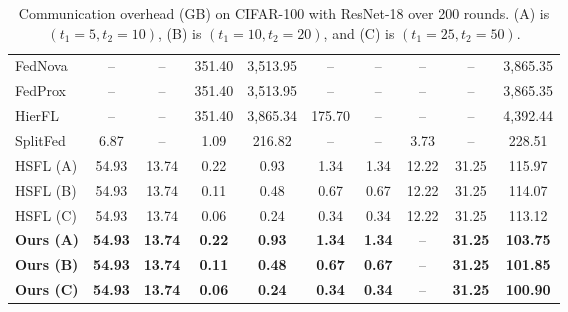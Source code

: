 \documentclass[letterpaper]{article} %
\begin{document}
\begin{table}[!ht]
\begin{tabular}{l|cccccccc|c}
            FedNova & -- & -- & 351.40 & 3,513.95 & -- & -- & -- & -- & 3,865.35 \\
            FedProx & -- & -- & 351.40 & 3,513.95 & -- & -- & -- & -- & 3,865.35 \\ \hline
            HierFL & -- & -- & 351.40 & 3,865.34 & 175.70 & -- & -- & -- & 4,392.44 \\ \hline
            SplitFed & 6.87 & -- & 1.09 & 216.82 & -- & -- & 3.73 & -- & 228.51 \\ \hline
            HSFL (A) & 54.93 & 13.74 & 0.22 & 0.93 & 1.34 & 1.34 & 12.22 & 31.25 & 115.97 \\
            HSFL (B) & 54.93 & 13.74 & 0.11 & 0.48 & 0.67 & 0.67 & 12.22 & 31.25 & 114.07 \\
            HSFL (C) & 54.93 & 13.74 & 0.06 & 0.24 & 0.34 & 0.34 & 12.22 & 31.25 & 113.12 \\ \hline
            \textbf{Ours (A)} & \textbf{54.93} & \textbf{13.74} & \textbf{0.22} & \textbf{0.93} & \textbf{1.34} & \textbf{1.34} & -- & \textbf{31.25} & \textbf{103.75} \\
            \textbf{Ours (B)} & \textbf{54.93} & \textbf{13.74} & \textbf{0.11} & \textbf{0.48} & \textbf{0.67} & \textbf{0.67} & -- & \textbf{31.25} & \textbf{101.85} \\
            \textbf{Ours (C)} & \textbf{54.93} & \textbf{13.74} & \textbf{0.06} & \textbf{0.24} & \textbf{0.34} & \textbf{0.34} & -- & \textbf{31.25} & \textbf{100.90} \\
            \hline
        \end{tabular}
        \caption{Communication overhead (GB) on CIFAR-100 with ResNet-18 over 200 rounds. 
        (A) is $(t_1=5, t_2=10)$, (B) is $(t_1=10, t_2=20)$, and (C) is $(t_1=25, t_2=50)$.}
        \label{tab:comm_overhead}
    \end{table}
\end{document}
